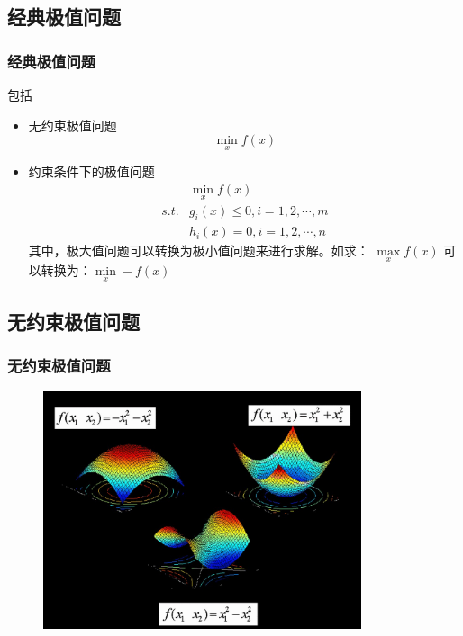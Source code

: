 \documentclass[slidestop,compress,mathserif,c]{beamer}
\begin{document}
\subsection{\hfill 经典极值问题}
\begin{frame}
\frametitle{经典极值问题}
包括
\begin{itemize}
    \item 无约束极值问题
      $$\min_xf(x)$$
    \item 约束条件下的极值问题
      \begin{eqnarray*}
        & \underset{x}{\min}f(x)\\
      s.t. & g_i(x)\leq 0, i=1,2,\cdots,m\\
           & h_i(x)=0, i=1,2,\cdots,n
  \end{eqnarray*}
  其中，极大值问题可以转换为极小值问题来进行求解。如求：
  $\underset{x}{\max}f(x)$
  可以转换为：$\underset{x}{\min}-f(x)$
\end{itemize}

\end{frame}

\subsection{\hfill 无约束极值问题}
\begin{frame}
\frametitle{无约束极值问题}
\begin{figure}[htbp]
  \includegraphics[height=7cm]{noneyueshu.jpg}
\end{figure}

\end{frame}

\end{document}
